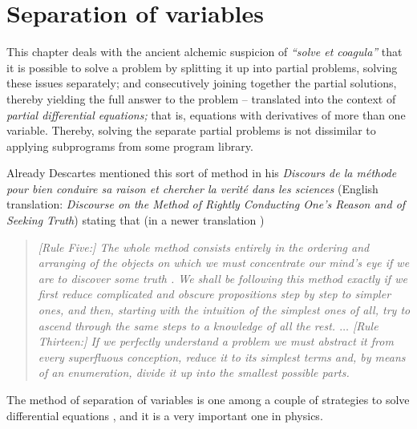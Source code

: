 \chapter{Separation of variables}
\label{2011-m-ch-sv}

This chapter deals with the ancient alchemic suspicion of {\it ``solve et coagula''} that it is possible
to solve a problem by splitting it up into partial problems, solving these issues separately; and
consecutively joining together the partial solutions, thereby yielding the full answer to the problem
-- translated into the context of {\em partial differential equations;}
that is, equations with derivatives of more than one variable.
Thereby, solving the separate partial problems is not dissimilar to
applying subprograms from some program library.

Already Descartes mentioned this sort of method in his
{\it Discours de la m{\'e}thode pour bien conduire sa raison et chercher la verit{\'e} dans les sciences}
(English translation: {\em Discourse on the Method of Rightly Conducting One's Reason and of Seeking Truth})
\cite{Descartes-Discourse} stating that (in a newer translation \cite{Descartes-CW1})
\begin{quote}
{\em
[Rule Five:]
The whole method consists entirely in the ordering and arranging of the
objects on which we must concentrate our mind's eye if we are to
discover some truth . We shall be following this method exactly if we first
reduce complicated and obscure propositions step by step to simpler
ones, and then, starting with the intuition of the simplest ones of all, try
to ascend through the same steps to a knowledge of all the rest.
$\ldots$
[Rule Thirteen:]
If we perfectly understand a problem we must abstract it from every
superfluous conception, reduce it to its simplest terms and, by means of
an enumeration, divide it up into the smallest possible parts.
}
\end{quote}

The method of
separation of variables
is one among a couple of strategies to solve differential equations
\cite{Evans98,jaenich-an},
and it is a very important one in physics.

